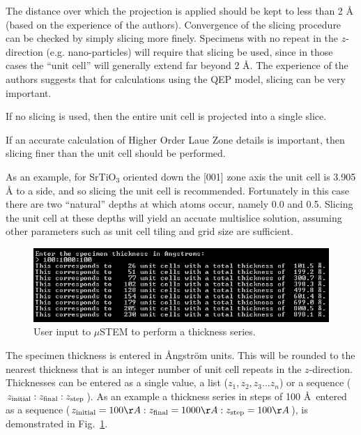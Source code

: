 \documentclass[12pt,a4paper]{article}
\begin{document}
The distance over which the projection is applied should be kept to less than 2 {\AA} (based on the experience of the authors).
Convergence of the slicing procedure can be checked by simply slicing more finely.
Specimens with no repeat in the $z$-direction (e.g. nano-particles) will require that slicing be used, since in those cases the ``unit cell'' will generally extend far beyond 2 \AA{}.
The experience of the authors suggests that for calculations using the QEP model, slicing can be very important.

If no slicing is used, then the entire unit cell is projected into a single slice.

If an accurate calculation of Higher Order Laue Zone details is important, then slicing finer than the unit cell should be performed.


As an example, for SrTiO$_3$ oriented down the [001] zone axis the unit cell is 3.905 \AA{} to a side, and so slicing the unit cell is recommended.
Fortunately in this case there are two ``natural'' depths at which atoms occur, namely 0.0 and 0.5.
Slicing the unit cell at these depths will yield an accuate multislice solution, assuming other parameters such as unit cell tiling and grid size are sufficient.

\begin{figure}[!h]
	\begin{center}
		\includegraphics[scale=1.0]{figures/thickness_series.png}
		\caption{User input to $\mu$STEM to perform a thickness series.}
		\label{fig:thickness_series}
	\end{center}
\end{figure}
The specimen thickness is entered in \AA{}ngstr\"om units.
This will be rounded to the nearest thickness that is an integer number of unit cell repeats in the $z$-direction.
Thicknesses can be entered as a single value, a list
($ z_1,z_2,z_3...z_n $)
or a sequence
($ z_{\rm initial}:z_{\rm final}:z_{\rm step}  $).
As an example a thickness series in steps of 100 \AA\, entered as a sequence ($ z_{\rm initial}=100\AA:z_{\rm final}=1000\AA:z_{\rm step}=100\AA  $), is demonstrated in Fig.~\ref{fig:thickness_series}.
\end{document}
